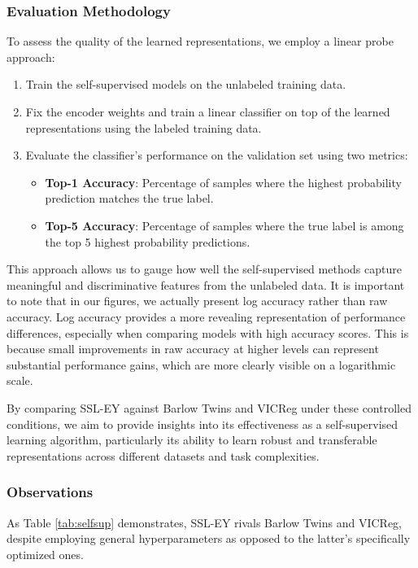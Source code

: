 \subsubsection{Evaluation Methodology}
To assess the quality of the learned representations, we employ a linear probe approach:

\begin{enumerate}
    \item Train the self-supervised models on the unlabeled training data.
    \item Fix the encoder weights and train a linear classifier on top of the learned representations using the labeled training data.
    \item Evaluate the classifier's performance on the validation set using two metrics:
        \begin{itemize}
            \item \textbf{Top-1 Accuracy}: Percentage of samples where the highest probability prediction matches the true label.
            \item \textbf{Top-5 Accuracy}: Percentage of samples where the true label is among the top 5 highest probability predictions.
        \end{itemize}
\end{enumerate}

This approach allows us to gauge how well the self-supervised methods capture meaningful and discriminative features from the unlabeled data.
It is important to note that in our figures, we actually present log accuracy rather than raw accuracy. Log accuracy provides a more revealing representation of performance differences, especially when comparing models with high accuracy scores. This is because small improvements in raw accuracy at higher levels can represent substantial performance gains, which are more clearly visible on a logarithmic scale.

By comparing SSL-EY against Barlow Twins and VICReg under these controlled conditions, we aim to provide insights into its effectiveness as a self-supervised learning algorithm, particularly its ability to learn robust and transferable representations across different datasets and task complexities.

\subsubsection{Observations} As Table \ref{tab:selfsup} demonstrates, SSL-EY rivals Barlow Twins and VICReg, despite employing general hyperparameters as opposed to the latter's specifically optimized ones.

